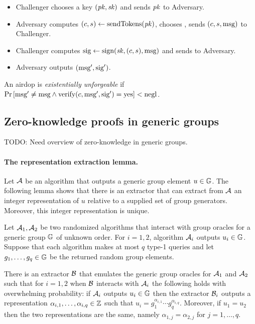 \begin{itemize}
\item Challenger chooses a key $(\mathit{pk}, \mathit{sk})$ and sends $\mathit{pk}$ to Adversary.

\item Adversary computes $(c, s) \gets \text{sendTokens}(\mathit{pk})$, chooses \msg, sends $(c, s, \text{msg})$ to Challenger.

\item Challenger computes $\text{sig} \gets \text{sign}(\mathit{sk}, (c, s), \text{msg})$ and sends to Adversary.

\item Adversary outputs $(\text{msg}', \text{sig}')$.

\end{itemize}
An airdop is \emph{existentially unforgeable} if
$\operatorname*{Pr}\left[{\text{msg}' \neq \text{msg} \wedge \text{verify}(c, \text{msg}', \text{sig}') = \text{yes}}\right] < \text{negl}$.


\subsection{Zero-knowledge proofs in generic groups}

TODO: Need overview of zero-knowledge in generic groups. 

\paragraph{The representation extraction lemma.}
Let $\mathcal{A}$ be an algorithm that outputs 
a generic group element $u \in \mathbb G$.
The following lemma shows that there is an extractor that
can extract from $\mathcal{A}$ an integer representation of $u$
relative to a supplied set of group generators.
Moreover, this integer representation is unique.

\begin{lemma}
\label{lem:unique}
Let $\mathcal{A}_1, \mathcal{A}_2$ be two randomized algorithms that interact
with group oracles for a generic group $\mathbb G$ of unknown order.
For $i=1,2$, algorithm $\mathcal{A}_i$ outputs $u_i \in \mathbb G$.
Suppose that each algorithm makes at most $q$ type-1 queries
and let $g_1,\ldots,g_q \in \mathbb G$ be the returned random group elements. 

There is an extractor $\mathcal{B}$ that emulates 
the generic group oracles for $\mathcal{A}_1$ and $\mathcal{A}_2$
such that for $i=1,2$ when $\mathcal{B}$ interacts with $\mathcal{A}_i$ 
the following holds with overwhelming probability:
if $\mathcal{A}_i$ outputs $u_i \in \mathbb G$ 
then the extractor $\mathcal{B}_i$ outputs a representation
$\alpha_{i,1},\ldots,\alpha_{i,q} \in \mathbb Z$
such that $u_i = g_1^{\alpha_{i,1}} \cdots g_q^{\alpha_{i,q}}$.
Moreover, if $u_1 = u_2$ then the two representations are the same,
namely $\alpha_{1,j} = \alpha_{2,j}$ for $j=1,\ldots,q$. 
\end{lemma}

